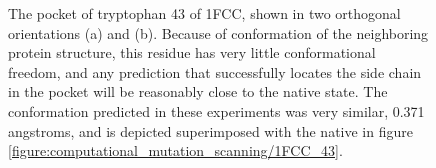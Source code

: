 \begin{figure}[h]
\begin{subfigure}[b]{0.3\textwidth}
        \caption{}
        \label{figure:mutation_side_chain_images/in_pocket_in_plane.png}
    \end{subfigure}
    \caption{The pocket of tryptophan 43 of 1FCC, shown in two orthogonal orientations (a) and (b).
Because of conformation of the neighboring protein structure, this residue has very little conformational freedom, and any prediction that successfully locates the side chain in the pocket will be reasonably close to the native state.
The conformation predicted in these experiments was very similar, 0.371 angstroms, and is depicted superimposed with the native in figure \protect\ref{figure:computational_mutation_scanning/1FCC_43}.}
    \label{figure:1fcc_43_pocket}
\end{figure}


